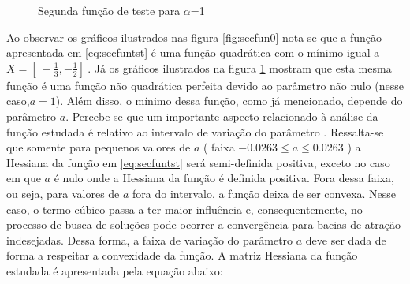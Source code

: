 \begin{figure}[h!]
    \centering 
    \qquad
    \qquad
    \caption{Segunda função de teste para $\alpha$=1}%
    \label{fig:secfun1}%
\end{figure}
\FloatBarrier

Ao observar os gráficos ilustrados nas figura \ref{fig:secfun0} nota-se que a função apresentada em \ref{eq:secfuntst} é uma função quadrática com o mínimo igual a $X =[\ -\frac{1}{3} , -\frac{1}{2} ]\ $. Já os gráficos ilustrados na figura \ref{fig:secfun1} mostram que esta mesma função é uma função não quadrática perfeita devido ao parâmetro não nulo (nesse caso,$a=1$). Além disso, o mínimo dessa função, como já mencionado, depende do parâmetro $a$.
Percebe-se que um importante aspecto relacionado à análise da função estudada é relativo ao intervalo de variação do parâmetro . Ressalta-se que somente para pequenos valores de $a$ ( faixa $-0.0263\leq a \leq 0.0263$ ) a Hessiana da função em \ref{eq:secfuntst} será semi-definida positiva, exceto no caso em que $a$ é nulo onde a Hessiana da função é definida positiva. Fora dessa faixa, ou seja, para valores de $a$ fora do intervalo, a função deixa de ser convexa. Nesse caso, o termo cúbico passa a ter maior influência e, consequentemente, no processo de busca de soluções pode ocorrer a convergência para bacias de atração indesejadas. Dessa forma, a faixa de variação do parâmetro $a$ deve ser dada de forma a respeitar a convexidade da função.
A matriz Hessiana da função estudada é apresentada pela equação abaixo:

